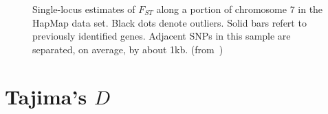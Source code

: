 \documentclass[12pt]{article}
\begin{document}
\begin{figure}
\begin{center}
\end{center}
\caption{Single-locus estimates of $F_{ST}$ along a portion of
  chromosome 7 in the HapMap data set. Black dots denote
  outliers. Solid bars refert to previously identified genes. Adjacent
  SNPs in this sample are separated, on average, by about
  1kb. (from~\cite{Guo-etal-2009})}\label{fig:high-res-SNP}
\end{figure}

\section*{Tajima's $D$}
\end{document}
